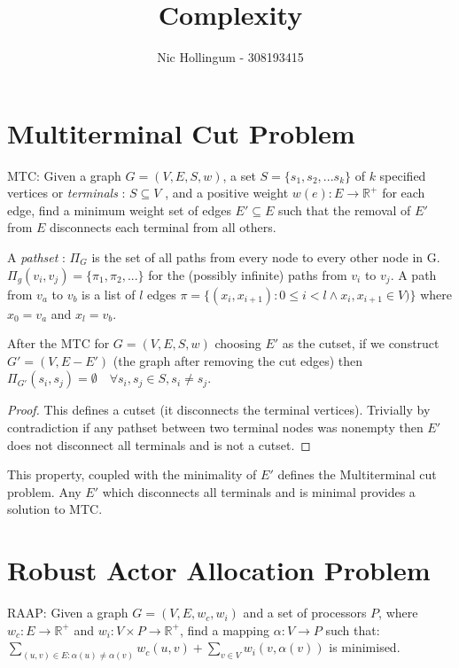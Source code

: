 \documentclass{article}
\author{Nic Hollingum - 308193415}
\title{Complexity}
\begin{document}
\section{Multiterminal Cut Problem}
MTC: Given a graph $G=(V,E,S,w)$, a set $S=\{s_1, s_2, ... s_k\}$ of $k$ specified vertices or {\em terminals} : $S \subseteq V$ , and a positive weight $w(e): E \rightarrow \mathbb{R}^+$ for each edge, find a minimum weight set of edges $E' \subseteq E$ such that the removal of $E'$ from $E$ disconnects each terminal from all others.

\begin{definition}
	A {\em pathset} : $\Pi_G$ is the set of all paths from every node to every other node in G.
	$\Pi_g(v_i, v_j) = \{\pi_1, \pi_2, ... \}$ for the (possibly infinite) paths from $v_i$ to $v_j$.
	A path from $v_a$ to $v_b$ is a list of $l$ edges $\pi =\{(x_i, x_{i+1}) : 0 \leq i < l \wedge x_i, x_{i+1} \in V)\}$ where $x_0 = v_a$ and $x_l = v_b$.
\end{definition}

\begin{observation}
	After the MTC for $G=(V,E,S,w)$ choosing $E'$ as the cutset, if we construct $G'=(V,E-E')$ (the graph after removing the cut edges) then $\Pi_{G'}(s_i, s_j) = \emptyset \quad \forall s_i, s_j \in S, s_i \neq s_j$.
\end{observation}

\begin{proof}
	This defines a cutset (it disconnects the terminal vertices).
	Trivially by contradiction if any pathset between two terminal nodes was nonempty then $E'$ does not disconnect all terminals and is not a cutset.
\end{proof}

This property, coupled with the minimality of $E'$ defines the Multiterminal cut problem.
Any $E'$ which disconnects all terminals and is minimal provides a solution to MTC.

\section{Robust Actor Allocation Problem}
RAAP: Given a graph $G=(V,E,w_c,w_i)$ and a set of processors $P$, where $w_c : E \rightarrow \mathbb{R}^+$ and $w_i : V \times P \rightarrow \mathbb{R}^+$, find a mapping $\alpha : V \rightarrow P$ such that:
$\displaystyle\sum\limits_{(u,v) \in E : \alpha(u) \neq \alpha(v)} w_c(u,v) + \displaystyle\sum\limits_{v \in V} w_i(v, \alpha(v))$ is minimised.
\end{document}
